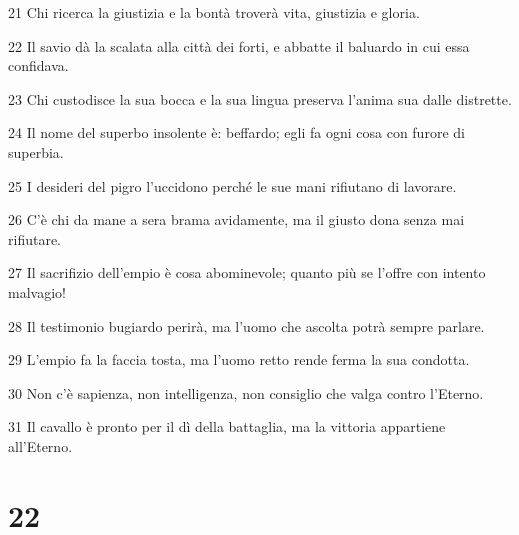 \par 21 Chi ricerca la giustizia e la bontà troverà vita, giustizia e gloria.
\par 22 Il savio dà la scalata alla città dei forti, e abbatte il baluardo in cui essa confidava.
\par 23 Chi custodisce la sua bocca e la sua lingua preserva l'anima sua dalle distrette.
\par 24 Il nome del superbo insolente è: beffardo; egli fa ogni cosa con furore di superbia.
\par 25 I desideri del pigro l'uccidono perché le sue mani rifiutano di lavorare.
\par 26 C'è chi da mane a sera brama avidamente, ma il giusto dona senza mai rifiutare.
\par 27 Il sacrifizio dell'empio è cosa abominevole; quanto più se l'offre con intento malvagio!
\par 28 Il testimonio bugiardo perirà, ma l'uomo che ascolta potrà sempre parlare.
\par 29 L'empio fa la faccia tosta, ma l'uomo retto rende ferma la sua condotta.
\par 30 Non c'è sapienza, non intelligenza, non consiglio che valga contro l'Eterno.
\par 31 Il cavallo è pronto per il dì della battaglia, ma la vittoria appartiene all'Eterno.

\chapter{22}

